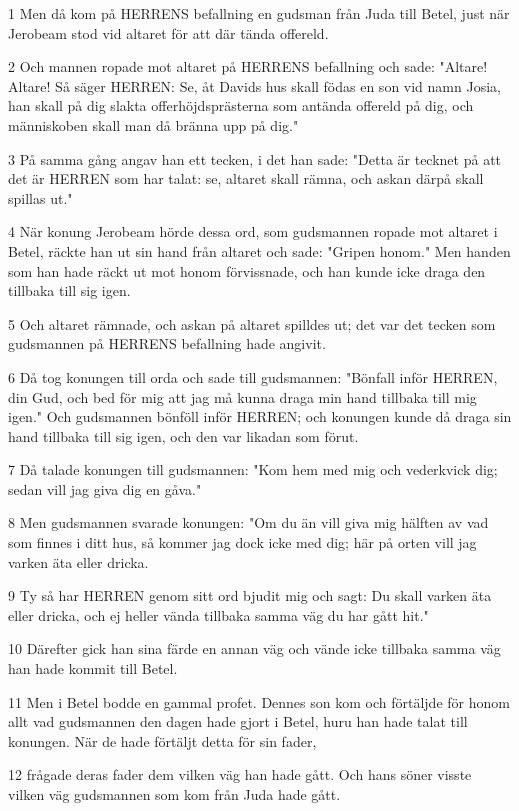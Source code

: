 \par 1 Men då kom på HERRENS befallning en gudsman från Juda till Betel, just när Jerobeam stod vid altaret för att där tända offereld.
\par 2 Och mannen ropade mot altaret på HERRENS befallning och sade: "Altare! Altare! Så säger HERREN: Se, åt Davids hus skall födas en son vid namn Josia, han skall på dig slakta offerhöjdsprästerna som antända offereld på dig, och människoben skall man då bränna upp på dig."
\par 3 På samma gång angav han ett tecken, i det han sade: "Detta är tecknet på att det är HERREN som har talat: se, altaret skall rämna, och askan därpå skall spillas ut."
\par 4 När konung Jerobeam hörde dessa ord, som gudsmannen ropade mot altaret i Betel, räckte han ut sin hand från altaret och sade: "Gripen honom." Men handen som han hade räckt ut mot honom förvissnade, och han kunde icke draga den tillbaka till sig igen.
\par 5 Och altaret rämnade, och askan på altaret spilldes ut; det var det tecken som gudsmannen på HERRENS befallning hade angivit.
\par 6 Då tog konungen till orda och sade till gudsmannen: "Bönfall inför HERREN, din Gud, och bed för mig att jag må kunna draga min hand tillbaka till mig igen." Och gudsmannen bönföll inför HERREN; och konungen kunde då draga sin hand tillbaka till sig igen, och den var likadan som förut.
\par 7 Då talade konungen till gudsmannen: "Kom hem med mig och vederkvick dig; sedan vill jag giva dig en gåva."
\par 8 Men gudsmannen svarade konungen: "Om du än vill giva mig hälften av vad som finnes i ditt hus, så kommer jag dock icke med dig; här på orten vill jag varken äta eller dricka.
\par 9 Ty så har HERREN genom sitt ord bjudit mig och sagt: Du skall varken äta eller dricka, och ej heller vända tillbaka samma väg du har gått hit."
\par 10 Därefter gick han sina färde en annan väg och vände icke tillbaka samma väg han hade kommit till Betel.
\par 11 Men i Betel bodde en gammal profet. Dennes son kom och förtäljde för honom allt vad gudsmannen den dagen hade gjort i Betel, huru han hade talat till konungen. När de hade förtäljt detta för sin fader,
\par 12 frågade deras fader dem vilken väg han hade gått. Och hans söner visste vilken väg gudsmannen som kom från Juda hade gått.
